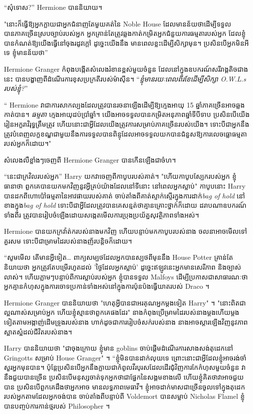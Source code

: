 {{“សុំទោស?” Hermione បាននិយាយ។

"នោះក៏ធ្វើឱ្យអ្នកក្លាយជាអ្នកជំនាញតែមួយគត់នៃ Noble House ដែលមានន័យថាដើម្បីទទួលបានភាគច្រើនស្របច្បាប់របស់អ្នក អ្នកគ្រាន់តែត្រូវឆ្លងកាត់កម្រិតអ្នកជំនួយការធម្មតារបស់អ្នក ដែលខ្ញុំបានកំណត់ឱ្យយើងធ្វើនៅចុងរដូវក្តៅ ដូច្នេះយើងនឹង មានពេលខ្លះដើម្បីសិក្សាមុន។ ប្រសិនបើអ្នកមិនអីទេ ខ្ញុំមានន័យថា”

Hermione Granger កំពុងបង្កើតសំលេងរំខានខ្ពស់មួយចំនួន ដែលនៅក្នុងឧបករណ៍សរីរាង្គតិចជាងនេះ បានបង្ហាញពីដំណើរការខុសប្រក្រតីរបស់ម៉ាស៊ីន។ “\emph{ខ្ញុំមានរយៈពេលពីរខែដើម្បីសិក្សា O.W.L.s របស់ខ្ញុំ?}”

“ Hermione វាជាការសាកល្បងដែលត្រូវបានរចនាឡើងដើម្បីឱ្យក្មេងអាយុ 15 ឆ្នាំភាគច្រើនអាចឆ្លងកាត់បាន។ \emph{ធម្មតា} ក្មេងអាយុដប់ប្រាំឆ្នាំ។ យើង​អាច​ទទួល​បាន​កម្រិត​អនុភាព​ឆ្នាំ​ទី​បី​ទាប ប្រសិនបើ​យើង​រៀន​អក្ខរាវិរុទ្ធ​ត្រឹមត្រូវ ហើយ​នោះ​ជា​អ្វី​ដែល​យើង​ត្រូវ​ការ​សម្រាប់​ភាគ​ច្រើន​របស់​យើង។ ទោះបីជាអ្នកនឹងត្រូវបំពេញលក្ខខណ្ឌជាមួយនឹងការទទួលបានពិន្ទុដែលអាចទទួលយកបានជំនួសឱ្យការលេចធ្លោធម្មតារបស់អ្នកក៏ដោយ។"

សំលេងលឺខ្លាំងៗចេញពី Hermione Granger បានកើនឡើងជាចំហ។

“នេះជាក្រវិលរបស់អ្នក” Harry យកវាចេញពីកាបូបរបស់គាត់។ "ហើយកាបូបស្បែករបស់អ្នក ខ្ញុំធានាថា ពួកគេបានយកមកវិញនូវអ្វីគ្រប់យ៉ាងដែលនៅទីនោះ នៅពេលអ្នកស្លាប់" កាបូបនោះ Harry បានដកពីហោប៉ៅធម្មតានៃអាវផាយរបស់គាត់ ចាប់តាំងពីគាត់ស្ទាក់ស្ទើរក្នុងការដាក់\emph{bag of hold} នៅខាងក្នុង\emph{bag of hold} ទោះបីជាអ្វីដែលត្រូវបានគេសន្មត់ថាគ្មានគ្រោះថ្នាក់ក៏ដោយ ដរាបណាឧបករណ៍ទាំងពីរ ត្រូវបានរៀបចំឡើងដោយសង្កេតមើលការប្រុងប្រយ័ត្នសុវត្ថិភាពទាំងអស់។

Hermione បានយកក្រវ៉ាត់ករបស់នាងមកវិញ ហើយបន្ទាប់មកកាបូបរបស់នាង ចលនាអាចមើលទៅគួរសម ទោះបីជាម្រាមដៃរបស់នាងញ័របន្តិចក៏ដោយ។

“សូមមើល តើមានអ្វីទៀត… ពាក្យសម្បថដែលអ្នកបានស្បថពីមុននឹង House Potter គ្រាន់តែនិយាយថា អ្នកត្រូវតែបម្រើរហូតដល់ 'ថ្ងៃដែលអ្នកស្លាប់' ដូច្នេះឥឡូវនេះអ្នកមានសេរីភាព និងច្បាស់លាស់។ ហើយភ្លាមៗបន្ទាប់ពីការស្លាប់របស់អ្នក ខ្ញុំបានទទួល Malfoys ដើម្បីប្រកាសជាសាធារណៈថាអ្នកគ្មានកំហុសក្នុងការចោទប្រកាន់ទាំងអស់នៅក្នុងការប៉ុនប៉ងធ្វើឃាតរបស់ Draco ។

Hermione Granger បាននិយាយថា "ហេតុអ្វីបានជាអរគុណអ្នកម្តងទៀត Harry" ។ "នោះពិតជាល្អណាស់សម្រាប់អ្នក ហើយខ្ញុំស្មានថាពួកគេផងដែរ" នាងកំពុងប្រើម្រាមដៃរបស់នាងម្ដងហើយម្ដងទៀតតាមអង្កាញ់ដើមទ្រូងរបស់នាង ហាក់ដូចជាការរៀបចំសក់របស់នាង នាងអាចស្ដារឡើងវិញនូវភាពស្អាតស្អំដល់ជីវិតរបស់នាង។

Harry បាននិយាយថា "ជាចុងក្រោយ ខ្ញុំមាន goblins ចាប់ផ្តើមដំណើរការសាងសង់តុដេកនៅ Gringotts សម្រាប់ House Granger" ។ “ខ្ញុំ​មិន​បាន​ដាក់​លុយ​ទេ ព្រោះ​នោះ​ជា​អ្វី​ដែល​ខ្ញុំ​អាច​រង់ចាំ​សួរ​អ្នក​មុន​បាន។ ប៉ុន្តែប្រសិនបើអ្នកនឹងក្លាយជាកំពូលវីរបុរសដែលដើរជុំវិញការកែកំហុសមួយចំនួន វានឹងជួយបានច្រើន ប្រសិនបើមនុស្សចាត់ទុកអ្នកថាជាផ្នែកនៃសង្គមខាងលើ ហើយខ្ញុំគិតថាវាអាចជួយបាន ប្រសិនបើពួកគេដឹងថាអ្នកអាច មានលទ្ធភាពមេធាវី។ ខ្ញុំអាចដាក់មាសជាច្រើនចូលទៅក្នុងតុដេករបស់អ្នកតាមដែលអ្នកចង់បាន ចាប់តាំងពីបន្ទាប់ពី Voldemort បានសម្លាប់ Nicholas Flamel ខ្ញុំបានបញ្ចប់ការកាន់ថ្មរបស់ Philosopher ។

}}

